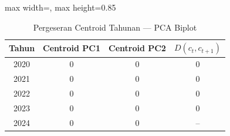\begin{table}[H]
\centering
\caption{Pergeseran Centroid Tahunan --- PCA Biplot} \label{tab:appcentroid_pca}
\begin{adjustbox}{max width=\textwidth, max height=0.85\textheight}
\begin{tabular}{|c|c|c|c|}
\hline
\textbf{Tahun} & \textbf{Centroid PC1} & \textbf{Centroid PC2} & \textbf{$D(c_t, c_{t+1})$} \\
\hline
2020 & 0 & 0 & 0 \\
2021 & 0 & 0 & 0 \\
2022 & 0 & 0 & 0 \\
2023 & 0 & 0 & 0 \\
2024 & 0 & 0 & -- \\
\hline
\end{tabular}
\end{adjustbox}
\end{table}